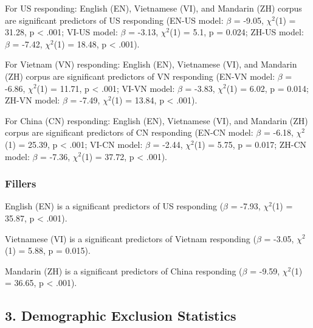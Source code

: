 \documentclass[10pt, letterpaper]{article}
\begin{document}
For US responding: English (EN), Vietnamese (VI), and Mandarin (ZH)
corpus are significant predictors of US responding (EN-US model:
\(\beta\) = -9.05, \(\chi^2\)(1) = 31.28, p \textless{} .001; VI-US
model: \(\beta\) = -3.13, \(\chi^2\)(1) = 5.1, p = 0.024; ZH-US model:
\(\beta\) = -7.42, \(\chi^2\)(1) = 18.48, p \textless{} .001).

For Vietnam (VN) responding: English (EN), Vietnamese (VI), and Mandarin
(ZH) corpus are significant predictors of VN responding (EN-VN model:
\(\beta\) = -6.86, \(\chi^2\)(1) = 11.71, p \textless{} .001; VI-VN
model: \(\beta\) = -3.83, \(\chi^2\)(1) = 6.02, p = 0.014; ZH-VN model:
\(\beta\) = -7.49, \(\chi^2\)(1) = 13.84, p \textless{} .001).

For China (CN) responding: English (EN), Vietnamese (VI), and Mandarin
(ZH) corpus are significant predictors of CN responding (EN-CN model:
\(\beta\) = -6.18, \(\chi^2\)(1) = 25.39, p \textless{} .001; VI-CN
model: \(\beta\) = -2.44, \(\chi^2\)(1) = 5.75, p = 0.017; ZH-CN model:
\(\beta\) = -7.36, \(\chi^2\)(1) = 37.72, p \textless{} .001).

\hypertarget{fillers}{%
\subsubsection{Fillers}\label{fillers}}

English (EN) is a significant predictors of US responding (\(\beta\) =
-7.93, \(\chi^2\)(1) = 35.87, p \textless{} .001).

Vietnamese (VI) is a significant predictors of Vietnam responding
(\(\beta\) = -3.05, \(\chi^2\)(1) = 5.88, p = 0.015).

Mandarin (ZH) is a significant predictors of China responding (\(\beta\)
= -9.59, \(\chi^2\)(1) = 36.65, p \textless{} .001).

\hypertarget{demographic-exclusion-statistics}{%
\subsection{3. Demographic Exclusion
Statistics}\label{demographic-exclusion-statistics}}
\end{document}
